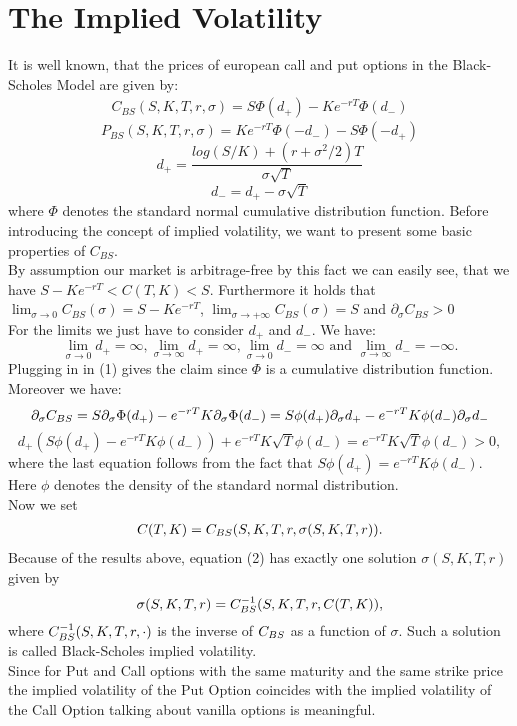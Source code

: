 \section{The Implied Volatility}

It is well known, that the prices of european call and put options in the Black-Scholes Model are given by:
\begin{align}
C_{BS}(S,K,T,r,\sigma)=S\Phi(d_+)-Ke^{-rT}\Phi(d_-)
\end{align}
$$P_{BS}(S,K,T,r,\sigma)=Ke^{-rT}\Phi(-d_-)-S\Phi(-d_+)$$
$$d_+=\frac{log(S/K)+(r+\sigma^2/2)T}{\sigma\sqrt{T}}$$
$$d_-=d_+-\sigma\sqrt{T}$$
where $\Phi$ denotes the standard normal cumulative distribution function.
Before introducing the concept of implied volatility, we want to present some basic properties of $C_{BS}$.\\
By assumption our market is arbitrage-free by this fact we can easily see, that we have $S-Ke^{-rT}<C(T,K)<S$.
Furthermore it holds that $\lim_{\sigma\rightarrow 0}C_{BS}(\sigma)=S-Ke^{-rT}$, $\lim_{\sigma\rightarrow +\infty}C_{BS}(\sigma)=S$ and
$\partial_\sigma C_{BS}>0$\\
For the limits we just have to consider $d_+$ and $d_-$. We have: $$\lim_{\sigma\rightarrow 0} d_+= \infty,\lim_{\sigma\rightarrow \infty} d_+= \infty, \lim_{\sigma\rightarrow 0} d_-= \infty \text{ and }\lim_{\sigma\rightarrow \infty} d_-= -\infty .$$
Plugging in in (1) gives the claim since $\Phi$ is a cumulative distribution function. Moreover we have:
$$\partial_\sigma C_{BS}=S\partial_\sigma\Phi(d_+)-e^{-rT}K\partial_\sigma\Phi(d_-)=S\phi(d_+)\partial_\sigma d_+-e^{-rT}K\phi(d_-)\partial_\sigma d_- $$
$$d_+(S\phi(d_+)-e^{-rT}K\phi(d_-))+e^{-rT}K\sqrt{T}\phi(d_-)=e^{-rT}K\sqrt{T}\phi(d_-)>0,$$
where the last equation follows from the fact that $S\phi(d_+)=e^{-rT}K\phi(d_-)$. Here $\phi$ denotes the density of the standard normal distribution.\\
Now we set
\begin{align}
C(T,K)=C_{BS}(S,K,T,r,\sigma(S,K,T,r)).
\end{align}
Because of the results above, equation (2) has exactly one solution $\sigma(S,K,T,r)$ given by
$$\sigma(S,K,T,r)=C_{BS}^{-1}(S,K,T,r,C(T,K)),$$
where $C_{BS}^{-1}(S,K,T,r,\cdot)$ is the inverse of $C_{BS}$ as a function of $\sigma$.
Such a solution is called Black-Scholes implied volatility.\\
Since for Put and Call options with the same maturity and the same strike price the implied volatility of the Put Option coincides with the implied volatility of the Call Option talking about vanilla options is meaningful.\\
